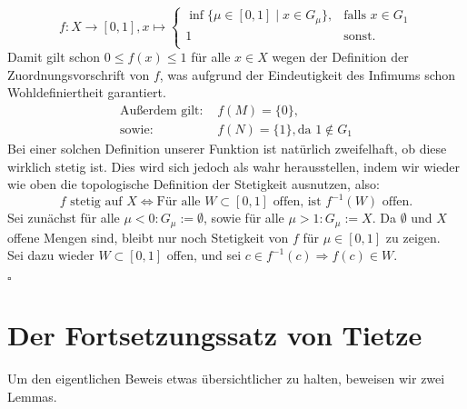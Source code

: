 \documentclass[11pt,leqno]{article}
\begin{document}
\[f:X \rightarrow [0,1], x \mapsto \begin{cases}
    \inf \{\mu \in [0,1] \mid x \in G_\mu\},  & \text{falls }x \in G_1\\
    1 & \text{sonst.} \\
\end{cases} \]
Damit gilt schon $0 \leq f(x) \leq 1$ für alle $x \in X$ wegen der Definition der Zuordnungsvorschrift von $f$, was aufgrund der Eindeutigkeit des
Infimums schon Wohldefiniertheit garantiert.
\begin{align*}
    \text{Außerdem gilt: } & f(M) = \{0\}, \\
    \text{sowie: } &         f(N) = \{1\}, \text{da } 1 \notin G_1 
\end{align*}
Bei einer solchen Definition unserer Funktion ist natürlich zweifelhaft, ob diese wirklich stetig ist. Dies wird sich jedoch als wahr herausstellen,
indem wir wieder wie oben die topologische Definition der Stetigkeit ausnutzen, also:
\[f \text{ stetig auf } X \Leftrightarrow \text{Für alle } W \subset [0,1] \text { offen, ist } f^{-1}(W) \text{ offen.}\]
Sei zunächst für alle $\mu < 0: G_\mu := \emptyset$, sowie für alle $\mu > 1: G_\mu := X.$
Da $\emptyset$ und $X$ offene Mengen sind, bleibt nur noch Stetigkeit von $f$ für $\mu \in [0,1]$ zu zeigen. \\
Sei dazu wieder $W \subset [0,1]$ offen, und sei $c \in f^{-1}(c) \Rightarrow f(c) \in W.$ 

\begin{flushright}
    $\square$
\end{flushright}

\section{Der Fortsetzungssatz von Tietze}
Um den eigentlichen Beweis etwas übersichtlicher zu halten, beweisen wir zwei Lemmas.
\end{document}
